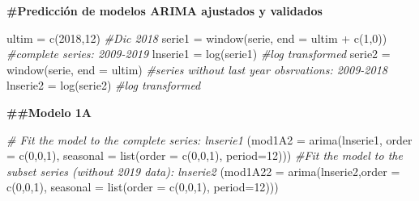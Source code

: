 \documentclass[
]{article}
\newenvironment{Shaded}{\begin{snugshade}}{\end{snugshade}}
\newcommand{\AttributeTok}[1]{\textcolor[rgb]{0.77,0.63,0.00}{#1}}
\newcommand{\CommentTok}[1]{\textcolor[rgb]{0.56,0.35,0.01}{\textit{#1}}}
\newcommand{\DecValTok}[1]{\textcolor[rgb]{0.00,0.00,0.81}{#1}}
\newcommand{\FunctionTok}[1]{\textcolor[rgb]{0.00,0.00,0.00}{#1}}
\newcommand{\NormalTok}[1]{#1}
\newcommand{\OtherTok}[1]{\textcolor[rgb]{0.56,0.35,0.01}{#1}}
\newcommand{\SpecialCharTok}[1]{\textcolor[rgb]{0.00,0.00,0.00}{#1}}
\begin{document}
\textbf{\#Predicción de modelos ARIMA ajustados y validados}

\begin{Shaded}
\begin{Highlighting}[]
\NormalTok{ultim }\OtherTok{=} \FunctionTok{c}\NormalTok{(}\DecValTok{2018}\NormalTok{,}\DecValTok{12}\NormalTok{)                       }\CommentTok{\#Dic 2018}
\NormalTok{serie1 }\OtherTok{=} \FunctionTok{window}\NormalTok{(serie, }\AttributeTok{end =}\NormalTok{ ultim }\SpecialCharTok{+} \FunctionTok{c}\NormalTok{(}\DecValTok{1}\NormalTok{,}\DecValTok{0}\NormalTok{))  }\CommentTok{\#complete series: 2009{-}2019}
\NormalTok{lnserie1 }\OtherTok{=} \FunctionTok{log}\NormalTok{(serie1)                   }\CommentTok{\#log transformed    }
\NormalTok{serie2 }\OtherTok{=} \FunctionTok{window}\NormalTok{(serie, }\AttributeTok{end =}\NormalTok{ ultim)         }\CommentTok{\#series without last year obsrvations: 2009{-}2018}
\NormalTok{lnserie2 }\OtherTok{=} \FunctionTok{log}\NormalTok{(serie2)                   }\CommentTok{\#log transformed}
\end{Highlighting}
\end{Shaded}

\textbf{\#\#Modelo 1A}

\begin{Shaded}
\begin{Highlighting}[]
\CommentTok{\# Fit the model to the complete series: lnserie1}
\NormalTok{(}\AttributeTok{mod1A2 =} \FunctionTok{arima}\NormalTok{(lnserie1, }\AttributeTok{order =} \FunctionTok{c}\NormalTok{(}\DecValTok{0}\NormalTok{,}\DecValTok{0}\NormalTok{,}\DecValTok{1}\NormalTok{), }\AttributeTok{seasonal =} \FunctionTok{list}\NormalTok{(}\AttributeTok{order =} \FunctionTok{c}\NormalTok{(}\DecValTok{0}\NormalTok{,}\DecValTok{0}\NormalTok{,}\DecValTok{1}\NormalTok{), }\AttributeTok{period=}\DecValTok{12}\NormalTok{)))}
\CommentTok{\#Fit the model to the subset series (without 2019 data): lnserie2}
\NormalTok{(}\AttributeTok{mod1A22 =} \FunctionTok{arima}\NormalTok{(lnserie2,}\AttributeTok{order =} \FunctionTok{c}\NormalTok{(}\DecValTok{0}\NormalTok{,}\DecValTok{0}\NormalTok{,}\DecValTok{1}\NormalTok{), }\AttributeTok{seasonal =} \FunctionTok{list}\NormalTok{(}\AttributeTok{order =} \FunctionTok{c}\NormalTok{(}\DecValTok{0}\NormalTok{,}\DecValTok{0}\NormalTok{,}\DecValTok{1}\NormalTok{), }\AttributeTok{period=}\DecValTok{12}\NormalTok{)))}
\end{Highlighting}
\end{Shaded}
\end{document}

